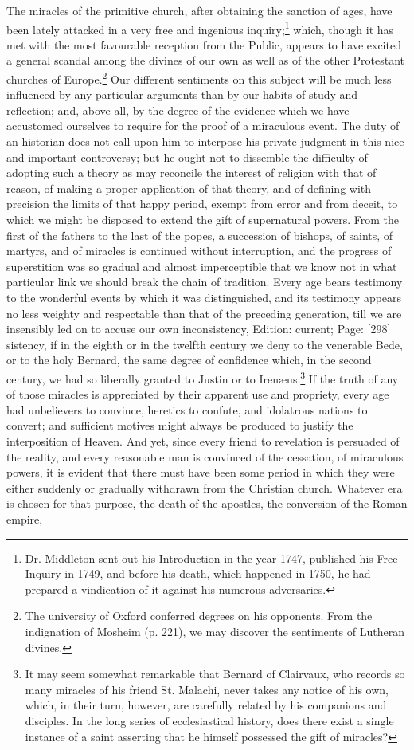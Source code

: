 The miracles of the primitive church, after obtaining the sanction of ages, have been lately attacked in a very free and ingenious inquiry;\footnote{Dr. Middleton sent out his Introduction in the year 1747, published his Free Inquiry in 1749, and before his death, which happened in 1750, he had prepared a vindication of it against his numerous adversaries.} which, though it has met with the most favourable reception from the Public, appears to have excited a general scandal among the divines of our own as well as of the other Protestant churches of Europe.\footnote{The university of Oxford conferred degrees on his opponents. From the indignation of Mosheim (p. 221), we may discover the sentiments of Lutheran divines.} Our different sentiments on this subject will be much less influenced by any particular arguments than by our habits of study and reflection; and, above all, by the degree of the evidence which we have accustomed ourselves to require for the proof of a miraculous event. The duty of an historian does not call upon him to interpose his private judgment in this nice and important controversy; but he ought not to dissemble the difficulty of adopting such a theory as may reconcile the interest of religion with that of reason, of making a proper application of that theory, and of defining with precision the limits of that happy period, exempt from error and from deceit, to which we might be disposed to extend the gift of supernatural powers. From the first of the fathers to the last of the popes, a succession of bishops, of saints, of martyrs, and of miracles is continued without interruption, and the progress of superstition was so gradual and almost imperceptible that we know not in what particular link we should break the chain of tradition. Every age bears testimony to the wonderful events by which it was distinguished, and its testimony appears no less weighty and respectable than that of the preceding generation, till we are insensibly led on to accuse our own inconsistency, Edition: current; Page: [298] sistency, if in the eighth or in the twelfth century we deny to the venerable Bede, or to the holy Bernard, the same degree of confidence which, in the second century, we had so liberally granted to Justin or to Irenæus.\footnote{It may seem somewhat remarkable that Bernard of Clairvaux, who records so many miracles of his friend St. Malachi, never takes any notice of his own, which, in their turn, however, are carefully related by his companions and disciples. In the long series of ecclesiastical history, does there exist a single instance of a saint asserting that he himself possessed the gift of miracles?} If the truth of any of those miracles is appreciated by their apparent use and propriety, every age had unbelievers to convince, heretics to confute, and idolatrous nations to convert; and sufficient motives might always be produced to justify the interposition of Heaven. And yet, since every friend to revelation is persuaded of the reality, and every reasonable man is convinced of the cessation, of miraculous powers, it is evident that there must have been some period in which they were either suddenly or gradually withdrawn from the Christian church. Whatever era is chosen for that purpose, the death of the apostles, the conversion of the Roman empire, 